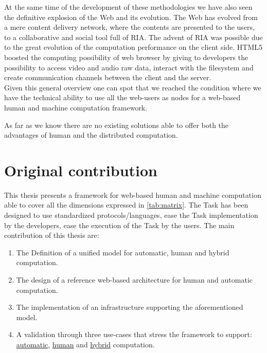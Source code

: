 At the same time of the development of these methodologies we have also
seen the definitive explosion of the Web and its evolution.
The Web has evolved from a mere content delivery network, where the contents are
presented to the users, to a collaborative and social tool full of \ac{RIA}. The
advent of \ac{RIA} was possible due to the great evolution of the computation
performance on the client side. \acs{HTML}5 boosted the computing possibility of web
browser by giving to developers the possibility to access video and audio raw data,
interact with the filesystem and create communication channels between the client
and the server.\\


Given this general overview one can spot that we reached the condition where we
have the technical ability to use all the web-users as nodes for a web-based human
and machine computation framework.

As far as we know there are no existing solutions able to offer both the
advantages of human and the distributed computation.


\section{Original contribution}
This thesis presents a framework for web-based human and machine
computation able to cover all the dimensions expressed in \autoref{tab:matrix}.
The Task has been designed to use standardized protocols/languages, ease the
Task implementation by the developers, ease the execution of the Task by the users.
The main contribution of this thesis are:
\begin{enumerate}
	\item The Definition of a unified model for automatic, human and hybrid
	computation.
	\item The design of a reference web-based architecture for human and
	automatic computation.
	\item The implementation of an infrastructure supporting the aforementioned model.
	\item A validation through three use-cases that stress the framework to support:
	\hyperref[sec:cases:automatic]{automatic}, \hyperref[sec:cases:human]{human}
	and \hyperref[sec:cases:hybrid]{hybrid} computation.
\end{enumerate}







